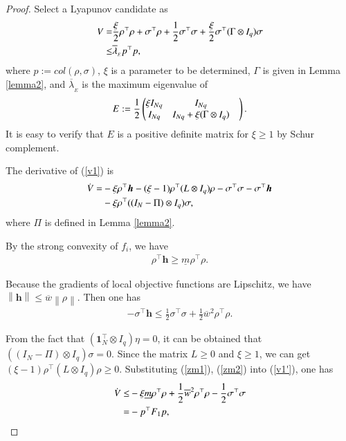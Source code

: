 \documentclass[final,5p,times,twocolumn,authoryear]{elsarticle}
\begin{document}
\begin{proof}
	
	Select a Lyapunov candidate as
	\begin{align}
		V =&\frac{\xi}{2}\rho^\top \rho + \sigma^\top \rho + \frac{1}{2}\sigma^\top \sigma + \frac{\xi}{2}\sigma^\top (\Gamma\otimes I_q)\sigma\notag\\
		\le&\overline\lambda_{_E} p^\top p,\label{v1}
	\end{align}
	where $p:=col(\rho,\sigma)$, $\xi$ is a parameter to be determined, $\Gamma$ is given in Lemma \autoref{lemma2}, and $\overline\lambda_{_E}$ is the maximum eigenvalue of
	\begin{align}
		E:=\frac{1}{2}
		\begin{pmatrix}
			\xi I_{Nq}& I_{Nq}& \\
			I_{Nq}& I_{Nq}+\xi (\Gamma\otimes I_q)& \\
		\end{pmatrix}.\notag
	\end{align}
	It is easy to verify that $E$ is a positive definite matrix for $\xi \ge 1$ by Schur complement.
	
	The derivative of (\ref{v1}) is
	\begin{align}
		\dot V = &-\xi\rho^\top \boldsymbol h - (\xi-1)\rho^\top (L\otimes I_q)\rho - \sigma^\top \sigma - \sigma^\top \boldsymbol h\notag\\
		& - \xi\rho^\top ((I_N-\Pi)\otimes I_q)\sigma,\label{v1'}
	\end{align}
	where $\Pi$ is defined in Lemma \autoref{lemma2}.
	
	By the strong convexity of $f_i$, we have
	\begin{align}
		\rho^\top \boldsymbol h\ge \underline m\rho^\top \rho.\label{zm1}
	\end{align}
	
	Because the gradients of local objective functions are Lipschitz, we have $
	\left \| \boldsymbol h \right \|\le \overline w\left\|\rho\right\|$.
	Then one has
	\begin{align}
		-\sigma^\top \boldsymbol h \le \frac{1}{2}\sigma^\top \sigma + \frac{1}{2}\overline w^2\rho^\top \rho.\label{zm2}
	\end{align}
	
	From the fact that $(\boldsymbol 1_N^\top \otimes I_q)\eta=0$, it can be obtained that $((I_N-\Pi)\otimes I_q)\sigma=0$. 
	Since the matrix $L\ge 0$ and $\xi\ge1$, we can get $(\xi-1)\rho^\top (L\otimes I_q)\rho\ge 0$. Substituting (\ref{zm1}), (\ref{zm2}) into (\ref{v1'}), one has
	\begin{align}
		\dot V \le &-\xi \underline m\rho^\top \rho + \frac{1}{2}\overline w^2\rho^\top \rho - \frac{1}{2}\sigma^\top \sigma\notag\\
		= & -p^\top F_1p,\notag
	\end{align}
	

\end{proof}
\end{document}
